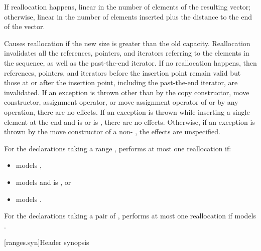 \documentclass{wg21}
\begin{document}
\begin{itemdescr}
    \pnum
    \complexity
    If reallocation happens,
    linear in the number of elements of the resulting vector;
    otherwise,
    linear in the number of elements inserted plus the distance
    to the end of the vector.

    \pnum
    \remarks
    Causes reallocation if the new size is greater than the old capacity.
    Reallocation invalidates all the references, pointers, and iterators
    referring to the elements in the sequence, as well as the past-the-end iterator.
    If no reallocation happens, then
    references, pointers, and iterators
    before the insertion point remain valid
    but those at or after the insertion point,
    including the past-the-end iterator,
    are invalidated.
    If an exception is thrown other than by
    the copy constructor, move constructor,
    assignment operator, or move assignment operator of
     or by any  operation,
    there are no effects.
    If an exception is thrown while inserting a single element at the end and
     is  or 
    is , there are no effects.
    Otherwise, if an exception is thrown by the move constructor of a non-
    , the effects are unspecified.

    \begin{addedblock}
    For the declarations taking a range , performs at most one reallocation if:
    \begin{itemize}
        \item {} models ,
        \item {} models  and  is , or
        \item {} models .
    \end{itemize}
     For the declarations taking a pair of , performs at most one reallocation if  models .
    \end{addedblock}

\end{itemdescr}

[ranges.syn]{Header  synopsis}
\end{document}
